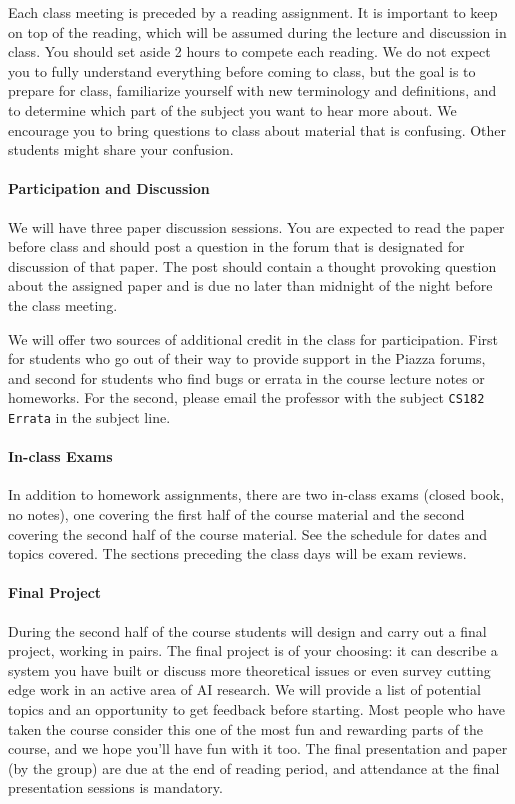 \documentclass[11pt]{article}
\begin{document}
Each class meeting is preceded by a reading assignment. It is
important to keep on top of the reading, which will be assumed during
the lecture and discussion in class. You should set aside 2 hours to
compete each reading. We do not expect you to fully understand
everything before coming to class, but the goal is to prepare for
class, familiarize yourself with new terminology and definitions, and
to determine which part of the subject you want to hear more about.
We encourage you to bring questions to class about material that is
confusing.  Other students might share your confusion.

\paragraph{Participation and Discussion}

We will have three paper discussion sessions. You are
expected to read the paper before class and should post a question in
the forum that is designated for discussion of that paper. The post
should contain a thought provoking question about the assigned paper
and is due no later than midnight of the night before the class
meeting.

We will offer two sources of additional credit in the class for
participation. First for students who go out of their way to provide
support in the Piazza forums, and second for students who
find bugs or errata in the course lecture notes or homeworks. For the
second, please email the professor with the subject \texttt{CS182
  Errata} in the subject line.


\paragraph{In-class Exams}

In addition to homework assignments, there are two in-class exams
(closed book, no notes), one covering the first half of the course
material and the second covering the second half of the course
material. See the schedule for dates and topics covered. The sections
preceding the class days will be exam reviews.

\paragraph{Final Project}

During the second half of the course students will design and carry
out a final project, working in pairs. The final project is of your
choosing: it can describe a system you have built or discuss more
theoretical issues or even survey cutting edge work in an active area
of AI research. We will provide a list of potential topics and an
opportunity to get feedback before starting. Most people who have
taken the course consider this one of the most fun and rewarding parts
of the course, and we hope you'll have fun with it too. The final
presentation and paper (by the group) are due at the end of reading
period, and attendance at the final presentation sessions is
mandatory.
\end{document}
